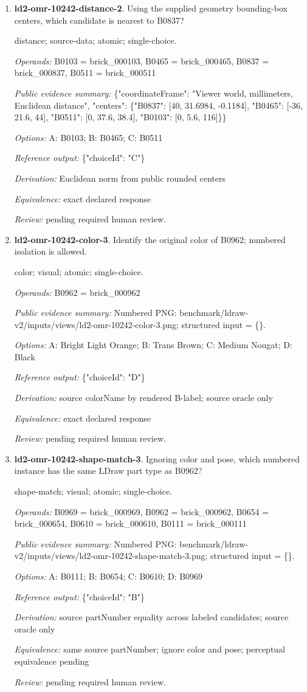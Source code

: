 \begin{enumerate}
\item \textbf{ld2-omr-10242-distance-2}. Using the supplied geometry bounding-box centers, which candidate is nearest to B0837?
\par{\small distance; source-data; atomic; single-choice.\par\textit{Operands:} B0103 = brick\_000103, B0465 = brick\_000465, B0837 = brick\_000837, B0511 = brick\_000511\par\textit{Public evidence summary:} \{"coordinateFrame": "Viewer world, millimeters, Euclidean distance", "centers": \{"B0837": [40, 31.6984, -0.1184], "B0465": [-36, 21.6, 44], "B0511": [0, 37.6, 38.4], "B0103": [0, 5.6, 116]\}\}\par\textit{Options:} A: B0103; B: B0465; C: B0511\par\textit{Reference output:} \{"choiceId": "C"\}\par\textit{Derivation:} Euclidean norm from public rounded centers\par\textit{Equivalence:} exact declared response\par\textit{Review:} pending required human review.}
\item \textbf{ld2-omr-10242-color-3}. Identify the original color of B0962; numbered isolation is allowed.
\par{\small color; visual; atomic; single-choice.\par\textit{Operands:} B0962 = brick\_000962\par\textit{Public evidence summary:} Numbered PNG: benchmark/ldraw-v2/inputs/views/ld2-omr-10242-color-3.png; structured input = \{\}.\par\textit{Options:} A: Bright Light Orange; B: Trans Brown; C: Medium Nougat; D: Black\par\textit{Reference output:} \{"choiceId": "D"\}\par\textit{Derivation:} source colorName by rendered B-label; source oracle only\par\textit{Equivalence:} exact declared response\par\textit{Review:} pending required human review.}
\item \textbf{ld2-omr-10242-shape-match-3}. Ignoring color and pose, which numbered instance has the same LDraw part type as B0962?
\par{\small shape-match; visual; atomic; single-choice.\par\textit{Operands:} B0969 = brick\_000969, B0962 = brick\_000962, B0654 = brick\_000654, B0610 = brick\_000610, B0111 = brick\_000111\par\textit{Public evidence summary:} Numbered PNG: benchmark/ldraw-v2/inputs/views/ld2-omr-10242-shape-match-3.png; structured input = \{\}.\par\textit{Options:} A: B0111; B: B0654; C: B0610; D: B0969\par\textit{Reference output:} \{"choiceId": "B"\}\par\textit{Derivation:} source partNumber equality across labeled candidates; source oracle only\par\textit{Equivalence:} same source partNumber; ignore color and pose; perceptual equivalence pending\par\textit{Review:} pending required human review.}

\end{enumerate}
